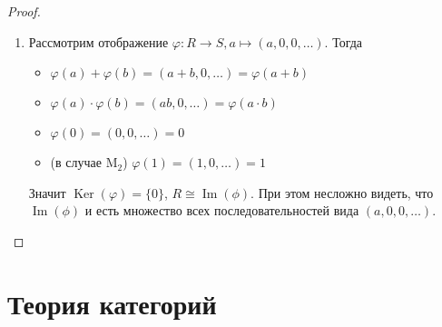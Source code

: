 \documentclass[12pt,a4paper]{article}
\DeclareMathOperator{\Img}{Im}
\DeclareMathOperator{\Ker}{Ker}
\newcommand{\M}{\ensuremath{\mathrm{M}}\xspace}
\begin{document}
\begin{proof}
\begin{enumerate}
            \item Рассмотрим отображение $\varphi: R \to S, a \mapsto (a, 0, 0, \dots)$. Тогда
                \begin{itemize}
                    \item $\varphi(a) + \varphi(b) = (a + b, 0, \dots) = \varphi(a + b)$
                    \item $\varphi(a) \cdot \varphi(b) = (ab, 0, \dots) = \varphi(a \cdot b)$
                    \item $\varphi(0) = (0, 0, \dots) = 0$
                    \item (в случае $\M_2$) $\varphi(1) = (1, 0, \dots) = 1$
                \end{itemize}
                Значит $\Ker(\varphi) = \{0\}$, $R \cong \Img(\phi)$. При этом несложно видеть, что $\Img(\phi)$ и есть множество всех последовательностей вида $(a, 0, 0, \dots)$.
        \end{enumerate}
    \end{proof}

    \newpage\null\thispagestyle{empty}\newpage
    \section{Теория категорий}
\end{document}
